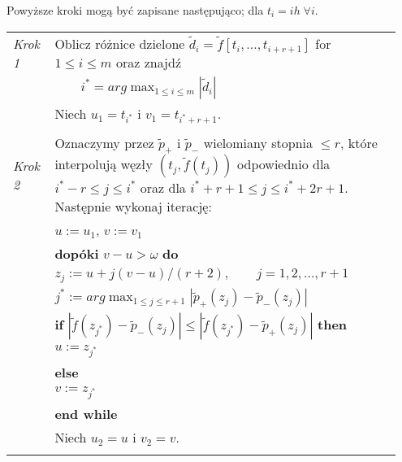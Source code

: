 \documentclass[oik, pdftex, robocza, man]{mgrwms}
\begin{document}
Powyższe kroki mogą być zapisane następująco; dla $t_i = ih \; \forall i$. \vspace{10pt}

\noindent
\begin{tabular}{p{0.10\linewidth} p{0.85\linewidth}}
    
    \textit{Krok 1} & Oblicz różnice dzielone $\tilde{d}_i = \tilde{f}[t_i, \ldots, t_{i+r+1}]$ for $1 \leq i \leq m $ oraz znajdź \\
                    & \(\displaystyle \qquad i^* = arg \max_{1 \leq i \leq m }|\tilde{d}_i| \)  \\
                    & Niech $u_1 = t_{i^*}$ i $v_1 = t_{i^* + r + 1}$. \\
                    & \\

    \textit{Krok 2} & Oznaczymy przez $\tilde{p}_+$ i $\tilde{p}_-$ wielomiany stopnia $ \leq r$, które interpolują węzły $(t_j, \tilde{f}(t_j))$ odpowiednio dla $i^* - r \leq j \leq i^*$ oraz dla $i^* + r + 1 \leq j \leq i^* + 2r + 1$. Następnie wykonaj iterację: \\
                    & $u := u_1$, $v := v_1$ \\
                    & \textbf{dopóki} $v-u > \omega$ \textbf{do} \\
                    & \hspace{20pt}$z_j := u + j(v-u) / (r+2), \qquad j = 1, 2, \ldots, r + 1$ \\
                    & \hspace{20pt}\(\displaystyle j^* := arg \max_{1 \leq j \leq r + 1}|\tilde{p}_{+}(z_j) - \tilde{p}_{-}(z_j)| \) \\
                    & \hspace{20pt}\textbf{if} $|\tilde{f}(z_{j^*}) - \tilde{p}_{-}(z_j)| \leq |\tilde{f}(z_{j^*}) - \tilde{p}_{+}(z_j)|$ \textbf{then} \\
                    & \hspace{40pt}$u:= z_{j^*}$ \\
                    & \hspace{20pt}\textbf{else} \\
                    & \hspace{40pt}$v:= z_{j^*}$ \\
                    & \textbf{end while} \\
                    & Niech $u_2 = u$ i $v_2 = v$. \\
                    & \\


\end{tabular}
\end{document}
